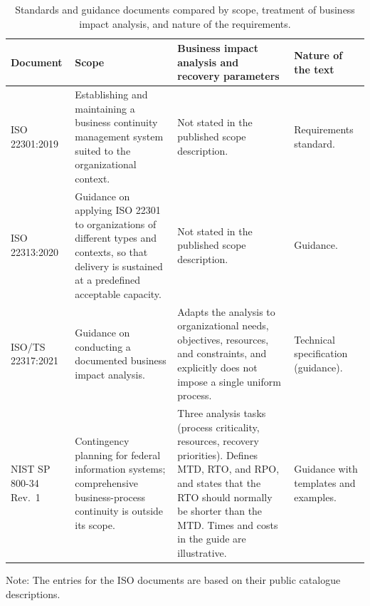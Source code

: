 \begin{table}[!t]
\centering
\caption{Standards and guidance documents compared by scope, treatment of business impact analysis, and nature of the requirements.}
\label{tab:lr_standards}
\footnotesize
\renewcommand{\arraystretch}{1.25}
\begin{tabularx}{\textwidth}{>{\raggedright\arraybackslash}p{2.6cm} >{\raggedright\arraybackslash}X >{\raggedright\arraybackslash}X >{\raggedright\arraybackslash}p{2.7cm}}
\toprule
\textbf{Document} & \textbf{Scope} & \textbf{Business impact analysis and recovery parameters} & \textbf{Nature of the text} \\
\midrule
ISO 22301:2019 \cite{iso22301catalogue} & Establishing and maintaining a business continuity management system suited to the organizational context. & Not stated in the published scope description. & Requirements standard. \\
ISO 22313:2020 \cite{iso22313catalogue} & Guidance on applying ISO 22301 to organizations of different types and contexts, so that delivery is sustained at a predefined acceptable capacity. & Not stated in the published scope description. & Guidance. \\
ISO/TS 22317:2021 \cite{iso22317catalogue} & Guidance on conducting a documented business impact analysis. & Adapts the analysis to organizational needs, objectives, resources, and constraints, and explicitly does not impose a single uniform process. & Technical specification (guidance). \\
NIST SP 800-34 Rev.~1 \cite{nist2010contingency} & Contingency planning for federal information systems; comprehensive business-process continuity is outside its scope. & Three analysis tasks (process criticality, resources, recovery priorities). Defines MTD, RTO, and RPO, and states that the RTO should normally be shorter than the MTD. Times and costs in the guide are illustrative. & Guidance with templates and examples. \\
\bottomrule
\end{tabularx}
\par\smallskip
\footnotesize Note: The entries for the ISO documents are based on their public catalogue descriptions.
\end{table}
